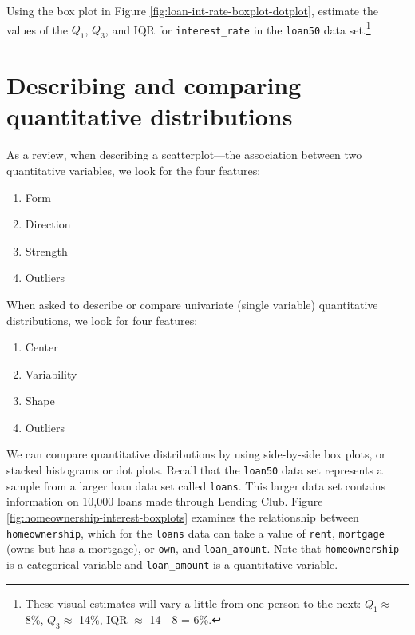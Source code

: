 \documentclass[
  10pt,
  openany]{book}
\providecommand{\tightlist}{%
  \setlength{\itemsep}{0pt}\setlength{\parskip}{0pt}}
\theoremstyle{definition}
\theoremstyle{definition}
\theoremstyle{definition}
\theoremstyle{definition}
\theoremstyle{remark}
\begin{document}
Using the box plot in Figure \ref{fig:loan-int-rate-boxplot-dotplot}, estimate the values of the \(Q_1\), \(Q_3\), and IQR for \texttt{interest\_rate} in the \texttt{loan50} data set.\footnote{These visual estimates will vary a little from one person to the next: \(Q_1 \approx\) 8\%, \(Q_3 \approx\) 14\%, IQR \(\approx\) 14 - 8 = 6\%.}

\section{Describing and comparing quantitative distributions}\label{describing-and-comparing-quantitative-distributions}

As a review, when describing a scatterplot---the association between
two quantitative variables, we look for the four features:

\begin{enumerate}
\def\labelenumi{\arabic{enumi}.}
\tightlist
\item
  Form
\item
  Direction
\item
  Strength
\item
  Outliers
\end{enumerate}

When asked to describe or compare univariate (single variable) quantitative distributions, we look for four features:

\begin{enumerate}
\def\labelenumi{\arabic{enumi}.}
\tightlist
\item
  Center
\item
  Variability
\item
  Shape
\item
  Outliers
\end{enumerate}

We can compare quantitative distributions by using side-by-side box plots,
or stacked histograms or dot plots. Recall that the \texttt{loan50} data set represents a sample from a larger loan data set called \texttt{loans}.
This larger data set contains information on 10,000 loans made through Lending Club. Figure \ref{fig:homeownership-interest-boxplots} examines the relationship between \texttt{homeownership}, which for the \texttt{loans} data can take a value of \texttt{rent}, \texttt{mortgage} (owns but has a mortgage), or \texttt{own}, and \texttt{loan\_amount}. Note that \texttt{homeownership}
is a categorical variable and \texttt{loan\_amount} is a quantitative variable.
\end{document}
